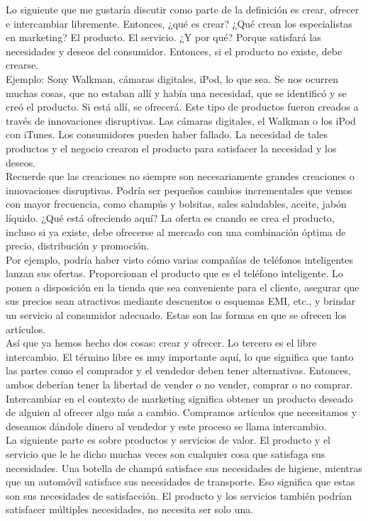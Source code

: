 \documentclass[10pt]{book}
\begin{document}
Lo siguiente que me gustaría discutir como parte de la definición es {\color{blue}crear, ofrecer e intercambiar libremente.} Entonces, ¿qué es crear? ¿Qué crean los especialistas en marketing? El producto. El servicio. ¿Y por qué? Porque satisfará las necesidades y deseos del consumidor. Entonces, {\color{blue}si el producto no existe, debe crearse.}\\
Ejemplo: Sony Walkman, cámaras digitales, iPod, lo que sea. Se nos ocurren muchas cosas, que no estaban allí y había una necesidad, que se identificó y se creó el producto. Si está allí, se ofrecerá. Este tipo de productos fueron creados a través de innovaciones disruptivas. Las cámaras digitales, el Walkman o los iPod con iTunes. Los consumidores pueden haber fallado. La necesidad de tales productos y el negocio crearon el producto para satisfacer la necesidad y los deseos.\\
Recuerde que las creaciones no siempre son necesariamente grandes creaciones o innovaciones disruptivas. Podría ser pequeños cambios incrementales que vemos con mayor frecuencia, como champús y bolsitas, sales saludables, aceite, jabón líquido. ¿Qué está ofreciendo aquí? La oferta es cuando se crea el producto, incluso si ya existe, {\color{blue}debe ofrecerse al mercado con una combinación óptima de precio, distribución y promoción.}\\
Por ejemplo, podría haber visto cómo varias compañías de teléfonos inteligentes lanzan sus ofertas. Proporcionan el producto que es el teléfono inteligente. Lo ponen a disposición en la tienda que sea conveniente para el cliente, asegurar que sus precios sean atractivos mediante descuentos o esquemas EMI, etc., y brindar un servicio al consumidor adecuado. Estas son las formas en que se ofrecen los artículos.\\
Así que ya hemos hecho dos cosas: crear y ofrecer. {\color{blue}Lo tercero es el libre intercambio.} El término libre es muy importante aquí, lo que significa que tanto las partes como el comprador y el vendedor deben tener alternativas. Entonces, ambos deberían tener la libertad de vender o no vender, comprar o no comprar.\\
Intercambiar en el contexto de marketing significa obtener un producto deseado de alguien al ofrecer algo más a cambio. Compramos artículos que necesitamos y deseamos dándole dinero al vendedor y este proceso se llama intercambio.\\
{\color{blue}La siguiente parte  es sobre productos y servicios de valor.} El producto y el servicio que le he dicho muchas veces son cualquier cosa que satisfaga sus necesidades. Una botella de champú satisface sus necesidades de higiene, mientras que un automóvil satisface sus necesidades de transporte. Eso significa que estas son sus necesidades de satisfacción. El producto y los servicios también podrían satisfacer múltiples necesidades, no necesita ser solo una.\\
\end{document}
